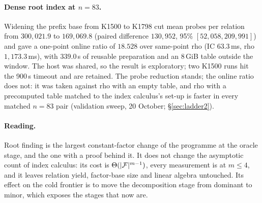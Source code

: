 \paragraph{Dense root index at $n=83$.} Widening the prefix base from
K1500 to K1798 cut mean probes per relation from $300{,}021.9$ to
$169{,}069.8$ (paired difference $130{,}952$, 95\% $[52{,}058,209{,}991]$)
and gave a one-point online ratio of $18.528$ over same-point rho (IC
$63.3$\,ms, rho $1{,}173.3$\,ms), with $339.0$\,s of reusable preparation
and an 8\,GiB table outside the window. The host was shared, so the result
is exploratory; two K1500 runs hit the 900\,s timeout and are retained.
The probe reduction stands; the online ratio does not: it was taken
against rho with an empty table, and rho with a precomputed table matched
to the index calculus's set-up is faster in every matched $n=83$ pair
(validation sweep, 20 October; \S\ref{sec:ladder2}).

\paragraph{Reading.} Root finding is the largest constant-factor change
of the programme at the oracle stage, and the one with a proof behind it.
It does not change the asymptotic count of index calculus: its cost is
$\Theta(\lvert \mathcal{F} \rvert^{m-1})$, every measurement is at $m\le4$, and it leaves
relation yield, factor-base size and linear algebra untouched. Its effect
on the cold frontier is to move the decomposition stage from dominant to
minor, which exposes the stages that now are.
